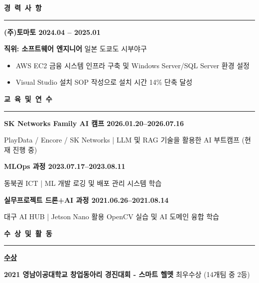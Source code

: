 \documentclass[a4paper, 10pt]{article}
\newcommand{\resumesection}[1]{%
  \vspace{8pt}
  \noindent
  {\large\bfseries #1}
  \vspace{2pt}
  \noindent\hrule
  \vspace{4pt}
}
\begin{document}

\resumesection{경\ 력\ 사\ 항}

\vspace{2pt}
\noindent
\textbf{(주)토마토 \hfill 2024.04 -- 2025.01}

\noindent
\textbf{\quad 직위: 소프트웨어 엔지니어} \hfill 일본 도쿄도 시부야구

\begin{itemize}
  \setlength{\itemsep}{1pt}
  \setlength{\parskip}{0pt}
  \item AWS EC2 금융 시스템 인프라 구축 및 Windows Server/SQL Server 환경 설정
  \item Visual Studio 설치 SOP 작성으로 설치 시간 14\% 단축 달성
\end{itemize}


\resumesection{교\ 육\ 및\ 연\ 수}

\vspace{2pt}
\noindent
\textbf{SK Networks Family AI 캠프 \hfill 2026.01.20--2026.07.16}

\noindent
{\small PlayData / Encore / SK Networks | LLM 및 RAG 기술을 활용한 AI 부트캠프 (현재 진행 중)}

\vspace{3pt}
\noindent
\textbf{MLOps 과정 \hfill 2023.07.17--2023.08.11}

\noindent
{\small 동북권 ICT | ML 개발 로깅 및 배포 관리 시스템 학습}

\vspace{3pt}
\noindent
\textbf{실무프로젝트 드론+AI 과정 \hfill 2021.06.26--2021.08.14}

\noindent
{\small 대구 AI HUB | Jetson Nano 활용 OpenCV 실습 및 AI 도메인 융합 학습}


\resumesection{수\ 상\ 및\ 활\ 동}

\vspace{2pt}
\noindent
\textbf{\underline{수상}}

\vspace{2pt}
\noindent
\textbf{2021 \hfill 영남이공대학교 창업동아리 경진대회 - 스마트 헬멧} \hfill 최우수상 (14개팀 중 2등)
\end{document}
